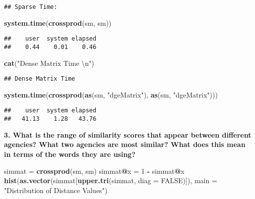 \documentclass[]{article}
\newenvironment{Shaded}{\begin{snugshade}}{\end{snugshade}}
\newcommand{\CharTok}[1]{\textcolor[rgb]{0.31,0.60,0.02}{#1}}
\newcommand{\DataTypeTok}[1]{\textcolor[rgb]{0.13,0.29,0.53}{#1}}
\newcommand{\DecValTok}[1]{\textcolor[rgb]{0.00,0.00,0.81}{#1}}
\newcommand{\KeywordTok}[1]{\textcolor[rgb]{0.13,0.29,0.53}{\textbf{#1}}}
\newcommand{\NormalTok}[1]{#1}
\newcommand{\OperatorTok}[1]{\textcolor[rgb]{0.81,0.36,0.00}{\textbf{#1}}}
\newcommand{\OtherTok}[1]{\textcolor[rgb]{0.56,0.35,0.01}{#1}}
\newcommand{\StringTok}[1]{\textcolor[rgb]{0.31,0.60,0.02}{#1}}
\begin{document}
\begin{verbatim}
## Sparse Time:
\end{verbatim}

\begin{Shaded}
\begin{Highlighting}[]
\KeywordTok{system.time}\NormalTok{(}\KeywordTok{crossprod}\NormalTok{(sm, sm))}
\end{Highlighting}
\end{Shaded}

\begin{verbatim}
##    user  system elapsed 
##    0.44    0.01    0.46
\end{verbatim}

\begin{Shaded}
\begin{Highlighting}[]
\KeywordTok{cat}\NormalTok{(}\StringTok{"Dense Matrix Time }\CharTok{\textbackslash{}n}\StringTok{"}\NormalTok{)}
\end{Highlighting}
\end{Shaded}

\begin{verbatim}
## Dense Matrix Time
\end{verbatim}

\begin{Shaded}
\begin{Highlighting}[]
\KeywordTok{system.time}\NormalTok{(}\KeywordTok{crossprod}\NormalTok{(}\KeywordTok{as}\NormalTok{(sm, }\StringTok{"dgeMatrix"}\NormalTok{), }\KeywordTok{as}\NormalTok{(sm, }\StringTok{"dgeMatrix"}\NormalTok{)))}
\end{Highlighting}
\end{Shaded}

\begin{verbatim}
##    user  system elapsed 
##   41.13    1.28   43.76
\end{verbatim}

\textbf{3. What is the range of similarity scores that appear between
different agencies? What two agencies are most similar? What does this
mean in terms of the words they are using?}

\begin{Shaded}
\begin{Highlighting}[]
\NormalTok{simmat =}\StringTok{ }\KeywordTok{crossprod}\NormalTok{(sm, sm)}
\NormalTok{simmat}\OperatorTok{@}\NormalTok{x =}\StringTok{ }\DecValTok{1} \OperatorTok{-}\StringTok{ }\NormalTok{simmat}\OperatorTok{@}\NormalTok{x}
\KeywordTok{hist}\NormalTok{(}\KeywordTok{as.vector}\NormalTok{(simmat[}\KeywordTok{upper.tri}\NormalTok{(simmat, }\DataTypeTok{diag =} \OtherTok{FALSE}\NormalTok{)]),}
     \DataTypeTok{main =} \StringTok{"Distribution of Distance Values"}\NormalTok{)}
\end{Highlighting}
\end{Shaded}
\end{document}
